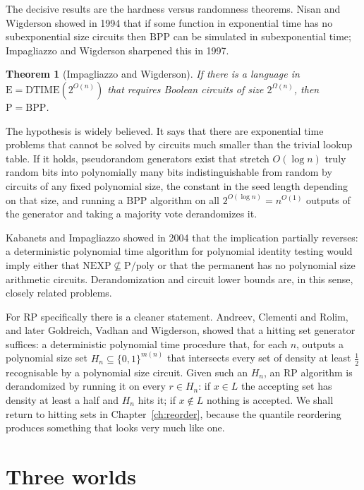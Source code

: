 \documentclass[11pt,twoside,openany]{book}
\theoremstyle{plain}
\newtheorem{theorem}{Theorem}[chapter]
\theoremstyle{definition}
\theoremstyle{remark}
\newcommand{\RP}{\mathrm{RP}}
\newcommand{\BPP}{\mathrm{BPP}}
\newcommand{\Pc}{\mathrm{P}}
\newcommand{\Ppoly}{\mathrm{P}/\mathrm{poly}}
\begin{document}
The decisive results are the hardness versus randomness theorems. Nisan and Wigderson showed in 1994 that if some function in exponential time has no subexponential size circuits then $\BPP$ can be simulated in subexponential time; Impagliazzo and Wigderson sharpened this in 1997.

\begin{theorem}[Impagliazzo and Wigderson]
If there is a language in $\mathrm{E} = \mathrm{DTIME}(2^{O(n)})$ that requires Boolean circuits of size $2^{\Omega(n)}$, then $\Pc = \BPP$.
\end{theorem}

The hypothesis is widely believed. It says that there are exponential time problems that cannot be solved by circuits much smaller than the trivial lookup table. If it holds, pseudorandom generators exist that stretch $O(\log n)$ truly random bits into polynomially many bits indistinguishable from random by circuits of any fixed polynomial size, the constant in the seed length depending on that size, and running a $\BPP$ algorithm on all $2^{O(\log n)} = n^{O(1)}$ outputs of the generator and taking a majority vote derandomizes it.

Kabanets and Impagliazzo showed in 2004 that the implication partially reverses: a deterministic polynomial time algorithm for polynomial identity testing would imply either that $\mathrm{NEXP} \not\subseteq \Ppoly$ or that the permanent has no polynomial size arithmetic circuits. Derandomization and circuit lower bounds are, in this sense, closely related problems.

For $\RP$ specifically there is a cleaner statement. Andreev, Clementi and Rolim, and later Goldreich, Vadhan and Wigderson, showed that a hitting set generator suffices: a deterministic polynomial time procedure that, for each $n$, outputs a polynomial size set $H_n \subseteq \{0,1\}^{m(n)}$ that intersects every set of density at least $\tfrac12$ recognisable by a polynomial size circuit. Given such an $H_n$, an $\RP$ algorithm is derandomized by running it on every $r \in H_n$: if $x \in L$ the accepting set has density at least a half and $H_n$ hits it; if $x \notin L$ nothing is accepted. We shall return to hitting sets in Chapter~\ref{ch:reorder}, because the quantile reordering produces something that looks very much like one.

\section{Three worlds}
\end{document}
